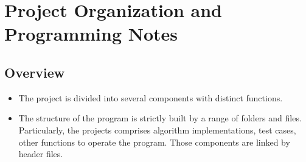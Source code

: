 \section{Project Organization and Programming Notes}

\subsection{Overview}
\begin{itemize}
    \item The project is divided into several components with distinct functions.
    \item The structure of the program is strictly built by a range of folders and files. Particularly, the projects comprises algorithm implementations, test cases, other functions to operate the program. Those components are linked by header files.
\end{itemize}


